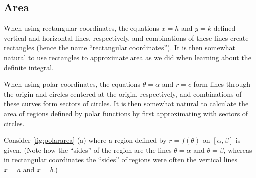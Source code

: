 \subsection{Area}

When using rectangular coordinates, the equations $x=h$ and $y=k$ defined vertical and horizontal lines, respectively, and combinations of these lines create rectangles (hence the name ``rectangular coordinates''). It is then somewhat natural to use rectangles to approximate area as we did when learning about the definite integral.


When using polar coordinates, the equations $\theta=\alpha$ and $r=c$ form lines through the origin and circles centered at the origin, respectively, and combinations of these curves form sectors of circles. It is then somewhat natural to calculate the area of regions defined by polar functions by first approximating with sectors of circles. 

Consider \autoref{fig:polararea} (a) where a region defined by $r=f(\theta)$ on $[\alpha,\beta]$ is given. (Note how the ``sides'' of the region are the lines $\theta=\alpha$ and $\theta=\beta$, whereas in rectangular coordinates the ``sides'' of regions were often the vertical lines $x=a$ and $x=b$.)

